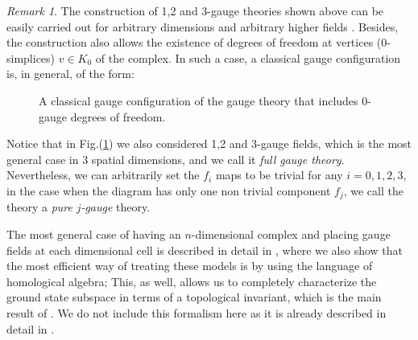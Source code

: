 \documentclass[titlepage,11pt]{article}
\theoremstyle{plain}%
\theoremstyle{definition}
\theoremstyle{remark}
\newtheorem{rem}[thm]{Remark}
\begin{document}
\begin{rem}\label{rem:0-gauge}
The construction of 1,2 and 3-gauge theories shown above can be easily carried out for arbitrary dimensions and arbitrary higher fields \cite{higher}. Besides, the construction also allows the existence of degrees of freedom at vertices (0-simplices) \(v \in K_0\) of the complex. In such a case, a classical gauge configuration is, in general, of the form:
\begin{figure}[h]
\centering
{}
\caption{\label{fig:0Gconf} A classical gauge configuration of the gauge theory that includes 0-gauge degrees of freedom.}
\end{figure}

Notice that in Fig.(\ref{fig:0Gconf}) we also considered 1,2 and 3-gauge fields, which is the most general case in 3 spatial dimensions, and we call it \emph{full gauge theory}. Nevertheless, we can arbitrarily set the \(f_i\) maps to be trivial for any \(i= 0,1,2,3\), in the case when the diagram has only one non trivial component \(f_j\), we call the theory a \emph{pure} \(j\)\emph{-gauge} theory.   


The most general case of having an $n$-dimensional complex and placing gauge fields at each dimensional cell is described in detail in \cite{higher,quali}, where we also show that the most efficient way of treating these models is by using the language of homological algebra; This, as well, allows us to completely characterize the ground state subspace in terms of a topological invariant, which is the main result of \cite{higher}. We do not include this formalism here as it is already described in detail in \cite{quali}. 
\end{rem}
\end{document}
